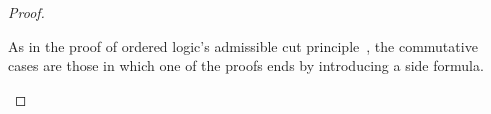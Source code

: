 \begin{proof}
\begin{description}[listparindent=\parindent, parsep=0pt]
  \item[Commutative cases]
    As in the proof of ordered logic's admissible cut principle~, the commutative cases are those in which one of the proofs ends by introducing a side formula.



\end{description}
\end{proof}
